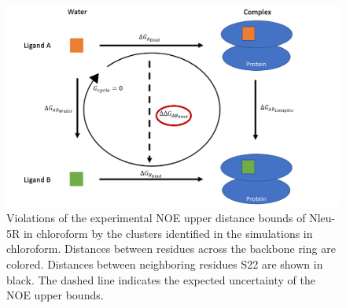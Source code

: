 \begin{table}[]
\centering
\caption{ Hydrogen bond occurrence in percentage for the sampled conformations in 
water  for  Nleu-5R,  Nleu-5S,  Nleu-2R,  and  Nleu-2S.  The  analysis  was  restricted  to  the 
clusters with the trans-peptoid bond.}
\label{tab: SIhbondRatios}
\end{table}


\begin{figure}
    \centering
    \includegraphics[width=\textwidth]{fig/dummy.png}
    \caption{Violations  of  the  experimental  NOE  upper  distance  bounds  of  Nleu-5R  in chloroform by the clusters identified in the simulations in chloroform. Distances              between residues across the backbone ring are colored. Distances between neighboring residues S22 are shown in black. The dashed line indicates the expected uncertainty         of the NOE upper bounds.}
    \label{fig: SINOE violations Nleu-5R}
\end{figure}

